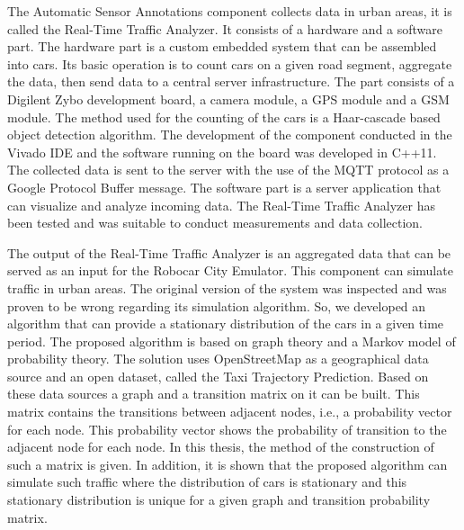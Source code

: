 \documentclass[b5paper,12pt]{report}
\theoremstyle{definition}
\begin{document}
The Automatic Sensor Annotations component collects data in urban areas, it is called the Real-Time Traffic Analyzer. It consists of a hardware and a software part. The hardware part is a custom embedded system that can be assembled into cars. Its basic operation is to count cars on a given road segment, aggregate the data, then send data to a central server infrastructure. The part consists of a Digilent Zybo development board, a camera module, a GPS module and a GSM module. The method used for the counting of the cars is a Haar-cascade based object detection algorithm. The development of the component conducted in the Vivado IDE and the software running on the board was developed in C++11. The collected data is sent to the server with the use of the MQTT protocol as a Google Protocol Buffer message. The software part is a server application that can visualize and analyze incoming data. The Real-Time Traffic Analyzer has been tested and was suitable to conduct measurements and data collection.

The output of the Real-Time Traffic Analyzer is an aggregated data that can be served as an input for the Robocar City Emulator. This component can simulate traffic in urban areas. The original version of the system was inspected and was proven to be wrong regarding its simulation algorithm. So, we developed an algorithm that can provide a stationary distribution of the cars in a given time period. The proposed algorithm is based on graph theory and a Markov model of probability theory. The solution uses OpenStreetMap as a geographical data source and an open dataset, called the Taxi Trajectory Prediction. Based on these data sources a graph and a transition matrix on it can be built. This matrix contains the transitions between adjacent nodes, i.e., a probability vector for each node. This probability vector shows the probability of transition to the adjacent node for each node. In this thesis, the method of the construction of such a matrix is given. In addition, it is shown that the proposed algorithm can simulate such traffic where the distribution of cars is stationary and this stationary distribution is unique for a given graph and transition probability matrix.

\newpage
\end{document}
